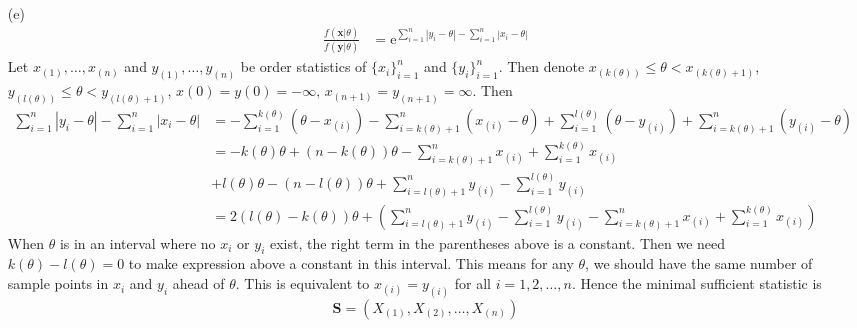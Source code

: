 \documentclass{article}
\begin{document}
\begin{enumerate}[leftmargin = 0 em, label = \arabic*., font = \bfseries]
\begin{itemize}
		      \item [(e)]
		            \begin{align*}
			            \frac{f(\bm x | \theta)}{f(\bm y | \theta)} & = \mathrm{e}^{\sum_{i=1}^n |y_i - \theta| - \sum_{i=1}^n |x_i - \theta|}
		            \end{align*}
		            Let $x_{(1)},\ldots, x_{(n)}$ and $y_{(1)}, \ldots , y_{(n)}$ be order statistics of $\{x_i\}_{i=1}^n$ and $\{y_i\}_{i=1}^n$. Then denote $x_{(k(\theta))} \leq \theta < x_{(k(\theta)+1)}$, $y_{(l(\theta))} \leq \theta < y_{(l(\theta)+1)}$, $x(0) = y(0) = -\infty ,\, x_{(n+1)} = y_{(n+1)} = \infty$. Then
		            \begin{align*}
			            \sum_{i=1}^n |y_i - \theta| - \sum_{i=1}^n |x_i - \theta| & = 	-\sum_{i=1}^{k(\theta)} (\theta - x_{(i)}) - \sum_{i=k(\theta) + 1}^n (x_{(i)} - \theta) + \sum_{i=1}^{l(\theta)} (\theta - y_{(i)}) + \sum_{i=k(\theta) + 1}^n (y_{(i)} - \theta)    \\
			                                                                      & = -k(\theta) \theta + (n - k(\theta)) \theta - \sum_{i=k(\theta) + 1}^n x_{(i)} + \sum_{i=1}^{k(\theta)} x_{(i)}                                                                         \\
			                                                                      & + l(\theta) \theta - (n - l(\theta)) \theta + \sum_{i=l(\theta) + 1}^n y_{(i)} - \sum_{i=1}^{l(\theta)} y_{(i)}                                                                          \\
			                                                                      & = 2 (l(\theta) - k(\theta)) \theta + \left( \sum_{i=l(\theta) + 1}^n y_{(i)} - \sum_{i=1}^{l(\theta)} y_{(i)} - \sum_{i=k(\theta) + 1}^n x_{(i)} + \sum_{i=1}^{k(\theta)} x_{(i)}\right)
		            \end{align*}
		            When $\theta$ is in an interval where no $x_i$ or $y_i$ exist, the right term in the parentheses above is a constant. Then we need $k(\theta) - l(\theta) = 0$ to make expression above a constant in this interval. This means for any $\theta$, we should have the same number of sample points in $x_i$ and $y_i$ ahead of $\theta$. This is equivalent to $x_{(i)} = y_{(i)}$ for all $i = 1,2, \ldots, n$. Hence the minimal sufficient statistic is
		            \[\bm S = (X_{(1)}, X_{(2)}, \ldots, X_{(n)})\]

	      \end{itemize}


\end{enumerate}
\end{document}
